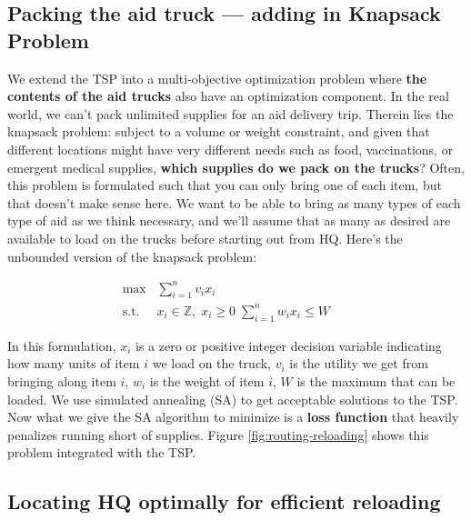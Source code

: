\documentclass[a0,final]{a0poster}
\begin{document}
\begin{multicols}{3}
\columnbreak



\subsection*{Packing the aid truck --- adding in Knapsack Problem}

\vspace{-6mm}

We extend the TSP into a multi-objective optimization problem
where \textbf{the contents of the aid trucks} also have an optimization component. In the real world, we can't pack unlimited supplies for an aid delivery trip. Therein lies
the knapsack problem: subject to a volume or weight constraint, and given that different locations
might have very different needs such as food, vaccinations, or emergent medical supplies, \textbf{which supplies do we pack on the trucks}?  Often, this problem is formulated such that you can only bring one of each item, but that doesn't make sense here. We want to be able to bring as many types of each type of aid as we think necessary, and we'll assume that as many as desired are available to load on the trucks before starting out from HQ. Here's the unbounded version of the knapsack problem:

\begin{align*}
\max &\sum_{i=1}^n v_i x_i &&  \\
\mathrm{s.t.} \; \; & x_i \in \mathbb{Z}, \; x_i \geq 0 \; \sum_{i=1}^n w_ix_i \leq W
\end{align*}

\noindent In this formulation, $x_{i}$ is a zero or positive integer decision variable indicating how many units of item $i$ we load on the truck, $v_i$ is the utility we get from bringing along item $i$, $w_i$ is the weight of item $i$, $W$ is the maximum that can be loaded. We use simulated annealing (SA) to get acceptable solutions to the TSP. Now what we give the SA algorithm to minimize is a \textbf{loss function} that heavily penalizes running short of supplies. Figure \ref{fig:routing-reloading} shows this problem integrated with the TSP.

\vspace{-6mm}

\subsection*{Locating HQ optimally for efficient reloading}


\end{multicols}
\end{document}
